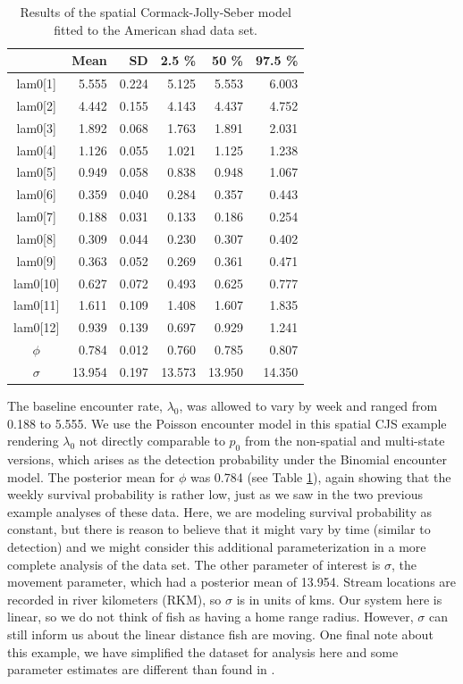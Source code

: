 \begin{table}
\centering
\caption{
Results of the spatial Cormack-Jolly-Seber model fitted to the 
American shad data set.
}
\begin{tabular}{crrrrr}
\hline \hline
&       Mean   &  SD  &  2.5 \%   &   50 \%    &  97.5 \% \\
\hline
lam0[1] &  5.555& 0.224  & 5.125 & 5.553 	& 6.003 \\
lam0[2] &  4.442& 0.155  & 4.143 & 4.437  & 4.752 \\
lam0[3] &  1.892& 0.068  & 1.763 & 1.891  & 2.031 \\
lam0[4] &  1.126& 0.055  & 1.021 & 1.125  & 1.238 \\
lam0[5] &  0.949& 0.058  & 0.838 & 0.948 & 1.067 \\
lam0[6] &  0.359& 0.040  & 0.284 & 0.357 & 0.443 \\
lam0[7] &  0.188& 0.031  & 0.133 & 0.186 &  0.254 \\
lam0[8] &  0.309 &0.044  & 0.230  & 0.307  & 0.402 \\
lam0[9]  & 0.363 &0.052 &  0.269 &  0.361 & 0.471 \\
lam0[10] & 0.627 &0.072  & 0.493  & 0.625  & 0.777 \\
lam0[11] & 1.611 &0.109  & 1.408  & 1.607  & 1.835 \\
lam0[12] & 0.939 &0.139 & 0.697  & 0.929  & 1.241 \\
$\phi$  &  0.784 &0.012  & 0.760  & 0.785  & 0.807 \\
$\sigma$ & 13.954& 0.197  & 13.573 & 13.950  & 14.350\\
\hline
\end{tabular}
\label{open.tab.shad1}
\end{table}

The baseline encounter rate, $\lambda_0$, was allowed to vary by week
and ranged from 0.188 to 5.555.  We use the Poisson encounter model in
this spatial CJS example rendering $\lambda_0$ not directly comparable
to $p_0$ from the non-spatial and multi-state versions, which arises as
the detection probability under the Binomial encounter model.
The posterior mean for $\phi$ was 0.784 (see Table
\ref{open.tab.shad1}), again showing that the weekly survival
probability is rather low, just as we saw in the two previous example
analyses of these data.  Here, we are modeling survival probability as
constant, but there is reason to believe that it might vary by time
(similar to detection) and we might consider this additional
parameterization in a more complete analysis of the data set. The
other parameter of interest is $\sigma$, the movement parameter, which
had a posterior mean of 13.954.  Stream locations are recorded in
river kilometers (RKM), so $\sigma$ is in units of kms.  Our system
here is linear, so we do not think of fish as having a home range
radius.  However, $\sigma$ can still inform us about the linear
distance fish are moving.  One final note about this example, we have
simplified the dataset for analysis here and some parameter estimates
are different than found in \citet{raabe_diss:2012}.

